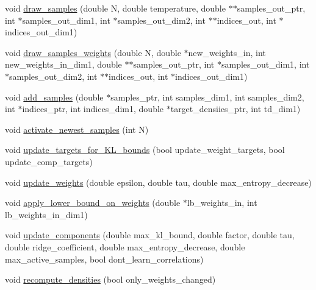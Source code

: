 \begin{DoxyCompactItemize}
\item 
void \hyperlink{classVIPS__PythonWrapper_ac0ae21747614c8e406953e9151578053}{draw\+\_\+samples} (double N, double temperature, double $\ast$$\ast$samples\+\_\+out\+\_\+ptr, int $\ast$samples\+\_\+out\+\_\+dim1, int $\ast$samples\+\_\+out\+\_\+dim2, int $\ast$$\ast$indices\+\_\+out, int $\ast$indices\+\_\+out\+\_\+dim1)
\item 
void \hyperlink{classVIPS__PythonWrapper_adc5d4067954f4164c25426e032b5335d}{draw\+\_\+samples\+\_\+weights} (double N, double $\ast$new\+\_\+weights\+\_\+in, int new\+\_\+weights\+\_\+in\+\_\+dim1, double $\ast$$\ast$samples\+\_\+out\+\_\+ptr, int $\ast$samples\+\_\+out\+\_\+dim1, int $\ast$samples\+\_\+out\+\_\+dim2, int $\ast$$\ast$indices\+\_\+out, int $\ast$indices\+\_\+out\+\_\+dim1)
\item 
void \hyperlink{classVIPS__PythonWrapper_a0437be0c6fedcf4ba567ad83a9f2ced0}{add\+\_\+samples} (double $\ast$samples\+\_\+ptr, int samples\+\_\+dim1, int samples\+\_\+dim2, int $\ast$indices\+\_\+ptr, int indices\+\_\+dim1, double $\ast$target\+\_\+densiies\+\_\+ptr, int td\+\_\+dim1)
\item 
void \hyperlink{classVIPS__PythonWrapper_adf716ef12426cda0f1b5f1d3aea52076}{activate\+\_\+newest\+\_\+samples} (int N)
\item 
void \hyperlink{classVIPS__PythonWrapper_a0e0bab32cbad5c82966440fd5d7e91db}{update\+\_\+targets\+\_\+for\+\_\+\+K\+L\+\_\+bounds} (bool update\+\_\+weight\+\_\+targets, bool update\+\_\+comp\+\_\+targets)
\item 
void \hyperlink{classVIPS__PythonWrapper_a0740ed7e521f3ace439565f1d97f83a7}{update\+\_\+weights} (double epsilon, double tau, double max\+\_\+entropy\+\_\+decrease)
\item 
void \hyperlink{classVIPS__PythonWrapper_ae5a7f4052cffe00c4fee8950387af61d}{apply\+\_\+lower\+\_\+bound\+\_\+on\+\_\+weights} (double $\ast$lb\+\_\+weights\+\_\+in, int lb\+\_\+weights\+\_\+in\+\_\+dim1)
\item 
void \hyperlink{classVIPS__PythonWrapper_a2a101ecaa2b2d445350e730a8e3b8064}{update\+\_\+components} (double max\+\_\+kl\+\_\+bound, double factor, double tau, double ridge\+\_\+coefficient, double max\+\_\+entropy\+\_\+decrease, double max\+\_\+active\+\_\+samples, bool dont\+\_\+learn\+\_\+correlations)
\item 
void \hyperlink{classVIPS__PythonWrapper_abf63652a9d7589cc189837ba41bcf322}{recompute\+\_\+densities} (bool only\+\_\+weights\+\_\+changed)
\item 

\end{DoxyCompactItemize}
